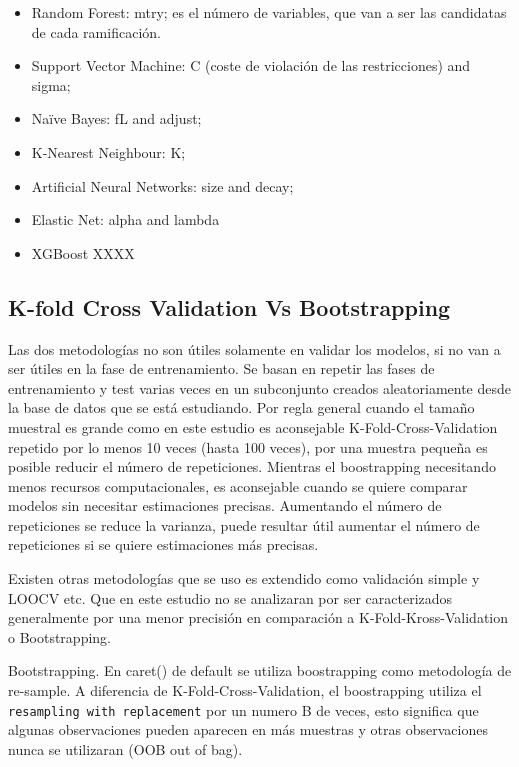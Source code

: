 \documentclass[
]{article}
\begin{document}
\begin{itemize}
\item
  Random Forest: mtry; es el número de variables, que van a ser las
  candidatas de cada ramificación.
\item
  Support Vector Machine: C (coste de violación de las restricciones)
  and sigma;
\item
  Naïve Bayes: fL and adjust;
\item
  K-Nearest Neighbour: K;
\item
  Artificial Neural Networks: size and decay;
\item
  Elastic Net: alpha and lambda
\item
  XGBoost XXXX
\end{itemize}

\hypertarget{k-fold-cross-validation-vs-bootstrapping}{%
\subsection{K-fold Cross Validation Vs
Bootstrapping}\label{k-fold-cross-validation-vs-bootstrapping}}

Las dos metodologías no son útiles solamente en validar los modelos, si
no van a ser útiles en la fase de entrenamiento. Se basan en repetir las
fases de entrenamiento y test varias veces en un subconjunto creados
aleatoriamente desde la base de datos que se está estudiando. Por regla
general cuando el tamaño muestral es grande como en este estudio es
aconsejable K-Fold-Cross-Validation repetido por lo menos 10 veces
(hasta 100 veces), por una muestra pequeña es posible reducir el número
de repeticiones. Mientras el boostrapping necesitando menos recursos
computacionales, es aconsejable cuando se quiere comparar modelos sin
necesitar estimaciones precisas. Aumentando el número de repeticiones se
reduce la varianza, puede resultar útil aumentar el número de
repeticiones si se quiere estimaciones más precisas.

Existen otras metodologías que se uso es extendido como validación
simple y LOOCV etc. Que en este estudio no se analizaran por ser
caracterizados generalmente por una menor precisión en comparación a
K-Fold-Kross-Validation o Bootstrapping.

Bootstrapping. En caret() de default se utiliza boostrapping como
metodología de re-sample. A diferencia de K-Fold-Cross-Validation, el
boostrapping utiliza el \texttt{resampling\ with\ replacement} por un
numero B de veces, esto significa que algunas observaciones pueden
aparecen en más muestras y otras observaciones nunca se utilizaran (OOB
out of bag).
\end{document}
